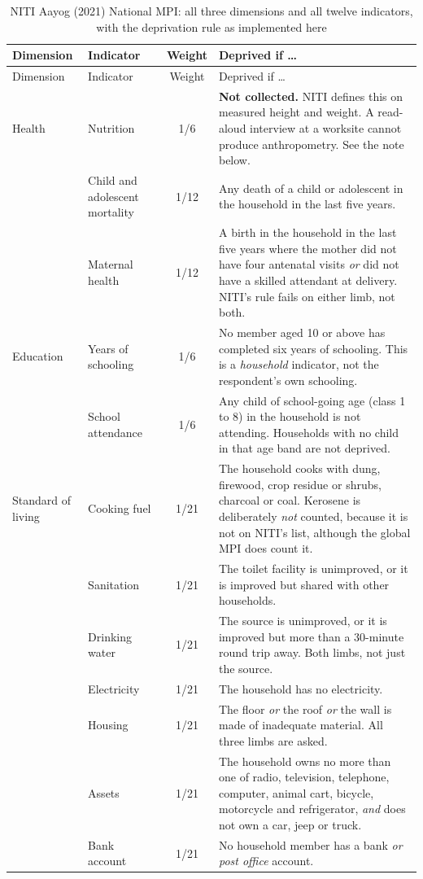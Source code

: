 \documentclass[11pt]{article}
\begin{document}
\begin{longtable}{@{}p{2.1cm}p{3.1cm}c p{6.6cm}@{}}
\caption{NITI Aayog (2021) National MPI: all three dimensions and all twelve indicators, with the deprivation rule as implemented here}\label{tab:niti}\\
\toprule
Dimension & Indicator & Weight & Deprived if \ldots \\
\midrule
\endfirsthead
\toprule
Dimension & Indicator & Weight & Deprived if \ldots \\
\midrule
\endhead
Health & Nutrition & 1/6 & \textbf{Not collected.} NITI defines this on measured height and weight. A read-aloud interview at a worksite cannot produce anthropometry. See the note below. \\
 & Child and adolescent mortality & 1/12 & Any death of a child or adolescent in the household in the last five years. \\
 & Maternal health & 1/12 & A birth in the household in the last five years where the mother did not have four antenatal visits \emph{or} did not have a skilled attendant at delivery. NITI's rule fails on either limb, not both. \\
\midrule
Education & Years of schooling & 1/6 & No member aged 10 or above has completed six years of schooling. This is a \emph{household} indicator, not the respondent's own schooling. \\
 & School attendance & 1/6 & Any child of school-going age (class 1 to 8) in the household is not attending. Households with no child in that age band are not deprived. \\
\midrule
Standard of living & Cooking fuel & 1/21 & The household cooks with dung, firewood, crop residue or shrubs, charcoal or coal. Kerosene is deliberately \emph{not} counted, because it is not on NITI's list, although the global MPI does count it. \\
 & Sanitation & 1/21 & The toilet facility is unimproved, or it is improved but shared with other households. \\
 & Drinking water & 1/21 & The source is unimproved, or it is improved but more than a 30-minute round trip away. Both limbs, not just the source. \\
 & Electricity & 1/21 & The household has no electricity. \\
 & Housing & 1/21 & The floor \emph{or} the roof \emph{or} the wall is made of inadequate material. All three limbs are asked. \\
 & Assets & 1/21 & The household owns no more than one of radio, television, telephone, computer, animal cart, bicycle, motorcycle and refrigerator, \emph{and} does not own a car, jeep or truck. \\
 & Bank account & 1/21 & No household member has a bank \emph{or post office} account. \\
\bottomrule
\end{longtable}
\end{document}
